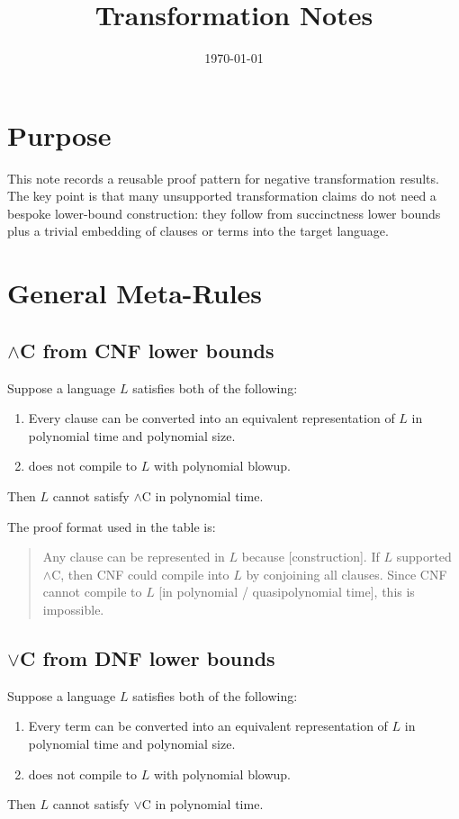 \documentclass[11pt]{article}
\title{Transformation Notes}
\date{\today}
\begin{document}
\maketitle

\section{Purpose}
This note records a reusable proof pattern for negative transformation results.
The key point is that many unsupported transformation claims do not need a bespoke lower-bound construction: they follow from succinctness lower bounds plus a trivial embedding of clauses or terms into the target language.

\section{General Meta-Rules}
\subsection{$\land$C from CNF lower bounds}
Suppose a language $L$ satisfies both of the following:
\begin{enumerate}[noitemsep]
  \item Every clause can be converted into an equivalent representation of $L$ in polynomial time and polynomial size.
  \item {} does not compile to $L$ with polynomial blowup.
\end{enumerate}
Then $L$ cannot satisfy $\land$C in polynomial time.

The proof format used in the table is:
\begin{quote}
Any clause can be represented in $L$ because [construction]. If $L$ supported $\land$C, then CNF could compile into $L$ by conjoining all clauses. Since CNF cannot compile to $L$ [in polynomial / quasipolynomial time], this is impossible.
\end{quote}

\subsection{$\lor$C from DNF lower bounds}
Suppose a language $L$ satisfies both of the following:
\begin{enumerate}[noitemsep]
  \item Every term can be converted into an equivalent representation of $L$ in polynomial time and polynomial size.
  \item {} does not compile to $L$ with polynomial blowup.
\end{enumerate}
Then $L$ cannot satisfy $\lor$C in polynomial time.
\end{document}

